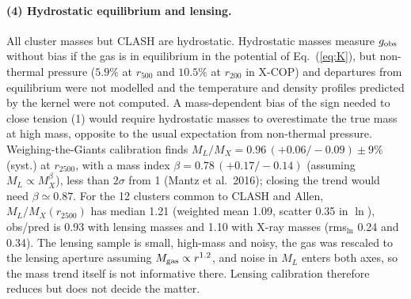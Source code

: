 \documentclass[11pt,a4paper]{article}
\begin{document}
\paragraph{(4) Hydrostatic equilibrium and lensing.} All cluster masses but CLASH are hydrostatic. Hydrostatic masses measure $g_{\rm obs}$ without bias if the gas is in equilibrium in the potential of Eq.~(\ref{eq:K}), but non-thermal pressure ($5.9\%$ at $r_{500}$ and $10.5\%$ at $r_{200}$ in X-COP) and departures from equilibrium were not modelled and the temperature and density profiles predicted by the kernel were not computed. A mass-dependent bias of the sign needed to close tension (1) would require hydrostatic masses to overestimate the true mass at high mass, opposite to the usual expectation from non-thermal pressure. Weighing-the-Giants calibration finds $M_L/M_X=0.96\,(+0.06/-0.09)\pm9\%$ (syst.) at $r_{2500}$, with a mass index $\beta=0.78\,(+0.17/-0.14)$ (assuming $M_L\propto M_X^\beta$), less than $2\sigma$ from 1 (Mantz et al.\ 2016); closing the trend would need $\beta\simeq0.87$. For the 12 clusters common to CLASH and Allen, $M_L/M_X(r_{2500})$ has median 1.21 (weighted mean 1.09, scatter 0.35 in $\ln$), obs/pred is 0.93 with lensing masses and 1.10 with X-ray masses (rms$_{\ln}$ 0.24 and 0.34). The lensing sample is small, high-mass and noisy, the gas was rescaled to the lensing aperture assuming $M_{\rm gas}\propto r^{1.2}$, and noise in $M_L$ enters both axes, so the mass trend itself is not informative there. Lensing calibration therefore reduces but does not decide the matter.
\end{document}
